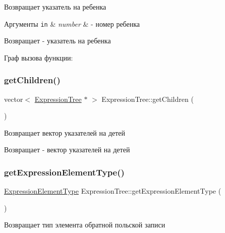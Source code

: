 Возвращает указатель на ребенка 


\begin{DoxyParams}[1]{Аргументы}
\mbox{\tt in}  & {\em number} & -\/ номер ребенка \\
\hline
\end{DoxyParams}
\begin{DoxyReturn}{Возвращает}
-\/ указатель на ребенка 
\end{DoxyReturn}
Граф вызова функции\+:
\mbox{\label{class_expression_tree_ac9cd919de3aa4392384d35ab3c59d6d0}} 
\subsubsection{\texorpdfstring{get\+Children()}{getChildren()}}
{\footnotesize\ttfamily vector$<$ \mbox{\hyperlink{class_expression_tree}{Expression\+Tree}} $\ast$ $>$ Expression\+Tree\+::get\+Children (\begin{DoxyParamCaption}{ }\end{DoxyParamCaption})}



Возвращает вектор указателей на детей 

\begin{DoxyReturn}{Возвращает}
-\/ вектор указателей на детей 
\end{DoxyReturn}
\mbox{\label{class_expression_tree_ab2d6cfdfb645e371d50cc5882053354f}} 
\subsubsection{\texorpdfstring{get\+Expression\+Element\+Type()}{getExpressionElementType()}}
{\footnotesize\ttfamily \mbox{\hyperlink{_expression_tree_8h_a3773a0b5484dde6ff527a03ae3b28b75}{Expression\+Element\+Type}} Expression\+Tree\+::get\+Expression\+Element\+Type (\begin{DoxyParamCaption}{ }\end{DoxyParamCaption})}



Возвращает тип элемента обратной польской записи 

